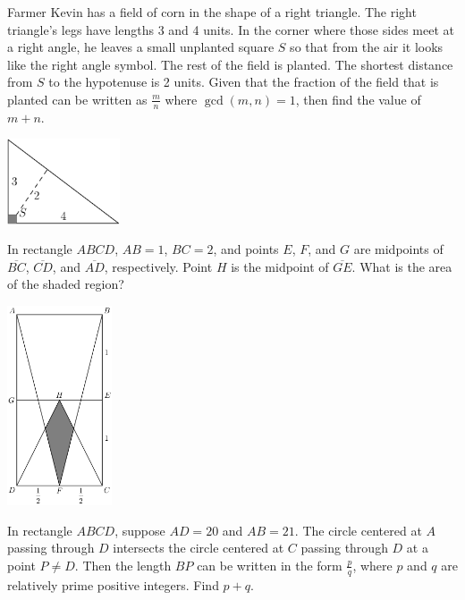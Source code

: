 \documentclass[11pt]{scrartcl}
\begin{document}
\begin{problem}[AMC 10A 2018/23]
Farmer Kevin has a field of corn in the shape of a right triangle. The right triangle's legs have lengths 3 and 4 units. In the corner where those sides meet at a right angle, he leaves a small unplanted square $S$ so that from the air it looks like the right angle symbol. The rest of the field is planted. The shortest distance from $S$ to the hypotenuse is 2 units. Given that the fraction of the field that is planted can be written as $\frac{m}{n}$ where $\gcd(m,n)=1$, then find the value of $m+n$.
\begin{center}

\includegraphics[width = 0.25\textwidth]{amc10a201823.png}
\end{center}
\end{problem}

\begin{problem}[AMC 10A 2014/16]
In rectangle $ABCD$, $AB=1$, $BC=2$, and points $E$, $F$, and $G$ are midpoints of $\overline{BC}$, $\overline{CD}$, and $\overline{AD}$, respectively. Point $H$ is the midpoint of $\overline{GE}$. What is the area of the shaded region?
\begin{center}
\includegraphics[width = 0.2325\textwidth]{amc10a201416}

\end{center}

\end{problem}

\begin{problem}[CIME I 2021/5]
In rectangle $ABCD$, suppose $AD = 20$ and $AB = 21$. The circle centered at $A$ passing through $D$ intersects the circle centered at $C$ passing through $D$ at a point $P \neq D$. Then the length $BP$ can be written in the form $\frac{p}{q}$, where $p$ and $q$ are relatively prime positive integers. Find $p + q$.
\end{problem}
\end{document}
